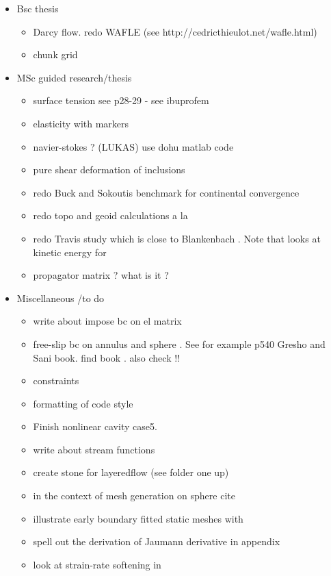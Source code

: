 
\begin{itemize}
\item Bsc thesis
\begin{itemize} 
\item Darcy flow. redo WAFLE (see http://cedricthieulot.net/wafle.html)
\item chunk grid
\end{itemize}
\item MSc guided research/thesis
\begin{itemize} 
\item surface tension see \cite{reddybook2}p28-29 - see ibuprofem 
\item elasticity with markers
\item navier-stokes ? (LUKAS) use dohu matlab code
\item pure shear deformation of inclusions \cite{trla00}
\item redo Buck and Sokoutis benchmark for continental convergence \cite{buso94}
\item redo topo and geoid calculations a la \cite{king09}
\item redo Travis study \cite{trab90} which is close to Blankenbach \cite{blbc89}. Note that \cite{maie12} looks at kinetic energy for \cite{trab90} 
\item propagator matrix ? what is it ? \mscthesis {} 
\Literature \cite{haoc78,haoc81,riha84,zhon96,como97,mohc98,zhzu00,lezh08,leha08,mofm07,wuch08,mibb09,fope91,lizh13,bugo94} 
\end{itemize}
\item Miscellaneous /to do
\begin{itemize} 
\item write about impose bc on el matrix
\item free-slip bc on annulus and sphere . See for example p540 Gresho and Sani book. find book \cite{deab72}.
also check \cite{ensa82} !!
\item constraints \cite{absh79}
\item formatting of code style
\item Finish nonlinear cavity case5.
\item write about stream functions 
\item create stone for layeredflow (see folder one up)
\item in the context of mesh generation on sphere cite \cite{moma19}
\item illustrate early boundary fitted static meshes with \cite{thar85}
\item \cite{bepo10} spell out the derivation of Jaumann derivative in appendix
\item look at strain-rate softening in \cite{belz02}
\end{itemize}



\end{itemize}
